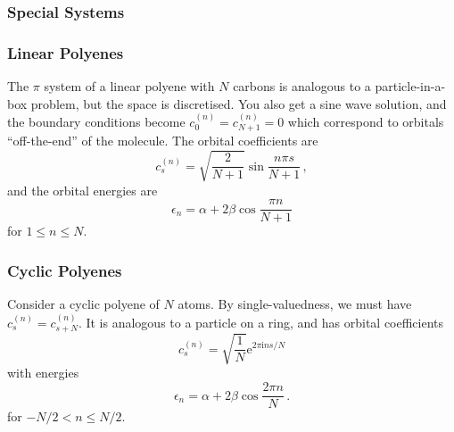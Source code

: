 \documentclass{article}
\theoremstyle{plain}\theoremheaderfont{\normalfont\itshape}\theorembodyfont{\rmfamily}\theoremseparator{.}\newtheorem*{rem}{Remark}\newtheorem*{ex}{Example}\newtheorem*{proof}{Proof}\newtheorem*{altp}{Alternative proof}
\theoremstyle{plain}\theoremheaderfont{\normalfont\bfseries}\theorembodyfont{\rmfamily}\theoremseparator{.}\newtheorem{thm}{Theorem}[section]\newtheorem{lem}[thm]{Lemma}\newtheorem{prop}[thm]{Proposition}\newtheorem*{cor}{Corollary}\newtheorem{defn}[thm]{Definition}\newtheorem{clm}[thm]{Claim}\newtheorem{clminproof}{Claim}\newtheorem{pos}{Postulate}[section]
\theoremstyle{break}\theoremheaderfont{\normalfont\itshape}\theorembodyfont{\rmfamily}\theoremseparator{.\medskip}\newtheorem*{proofskip}{Proof}\newtheorem*{exs}{Examples}\newtheorem*{rems}{Remarks}
\theoremstyle{break}\theoremheaderfont{\normalfont\bfseries}\theorembodyfont{\rmfamily}\theoremseparator{.\medskip}\newtheorem{lemskip}[thm]{Lemma}\newtheorem{defnskip}[thm]{Definition}\newtheorem{propskip}[thm]{Proposition}\newtheorem{thmskip}[thm]{Theorem}
\numberwithin{equation}{section}
\newcommand{\ii}{\mathrm{i}}
\newcommand{\ee}{\mathrm{e}}
\begin{document}
    \subsubsection{Special Systems}
    \subsubsection*{Linear Polyenes}
    The \(\pi\) system of a linear polyene with \(N\) carbons is analogous to a particle-in-a-box problem, but the space is discretised. You also get a sine wave solution, and the boundary conditions become \(c_0^{(n)}=c_{N+1}^{(n)}=0\) which correspond to orbitals ``off-the-end'' of the molecule. The orbital coefficients are
    \begin{equation}
        c_{s}^{(n)}=\sqrt{\frac{2}{N+1}}\sin\frac{n \pi s}{N+1}\,,
    \end{equation}
    and the orbital energies are
    \begin{equation}
        \epsilon_n=\alpha+2\beta\cos\frac{\pi n}{N+1}
    \end{equation}
    for \(1\le n\le N\).

    \begin{figure}[ht!]
        \centering
    \end{figure}

    \subsubsection*{Cyclic Polyenes}
    Consider a cyclic polyene of \(N\) atoms. By single-valuedness, we must have \(c_s^{(n)}=c_{s+N}^{(n)}\). It is analogous to a particle on a ring, and has orbital coefficients
    \begin{equation}\label{cyclic_polyene_coeff}
        c_s^{(n)}=\sqrt{\frac{1}{N}}\ee^{2\pi \ii ns/N}
    \end{equation}
    with energies
    \begin{equation}
        \epsilon_n=\alpha+2\beta\cos\frac{2\pi n}{N}\,.
    \end{equation}
    for \(-N/2< n\le N/2\).
\end{document}
